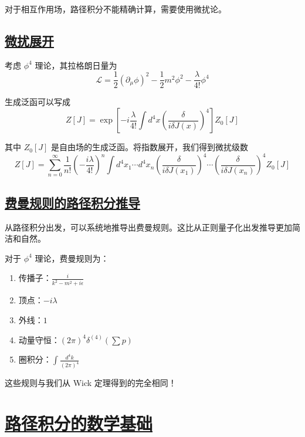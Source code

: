 对于相互作用场，路径积分不能精确计算，需要使用微扰论。

\subsection{\protect\hyperlink{:}{微扰展开}}

考虑 $\phi^4$ 理论，其拉格朗日量为
\begin{equation}
    \mathcal{L} = \frac{1}{2}(\partial_\mu\phi)^2 - \frac{1}{2}m^2\phi^2 - \frac{\lambda}{4!}\phi^4
\end{equation}

生成泛函可以写成
\begin{equation}
    Z[J] = \exp\left[-i\frac{\lambda}{4!}\int d^4x \left(\frac{\delta}{i\delta J(x)}\right)^4\right] Z_0[J]
\end{equation}

其中 $Z_0[J]$ 是自由场的生成泛函。将指数展开，我们得到微扰级数
\begin{equation}
    Z[J] = \sum_{n=0}^{\infty} \frac{1}{n!}\left(-\frac{i\lambda}{4!}\right)^n \int d^4x_1 \cdots d^4x_n \left(\frac{\delta}{i\delta J(x_1)}\right)^4 \cdots \left(\frac{\delta}{i\delta J(x_n)}\right)^4 Z_0[J]
\end{equation}

\subsection{\protect\hyperlink{:}{费曼规则的路径积分推导}}

从路径积分出发，可以系统地推导出费曼规则。这比从正则量子化出发推导更加简洁和自然。

对于 $\phi^4$ 理论，费曼规则为：
\begin{enumerate}
    \item 传播子：$\displaystyle \frac{i}{k^2 - m^2 + i\epsilon}$
    \item 顶点：$-i\lambda$
    \item 外线：$1$
    \item 动量守恒：$(2\pi)^4\delta^{(4)}(\sum p)$
    \item 圈积分：$\displaystyle \int \frac{d^4k}{(2\pi)^4}$
\end{enumerate}

这些规则与我们从 Wick 定理得到的完全相同！

\section{\protect\hyperlink{:}{路径积分的数学基础}}

